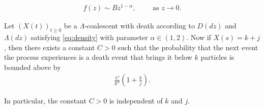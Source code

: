 \documentclass[10pt,a4paper]{amsart}
\begin{document}
\begin{align*}\label{eq:density}\tag{$\star$}
    f(z) \sim Bz^{1-\alpha}, \qquad \text{ as $z \to 0$}.
\end{align*}

\begin{lemma}\label{L:largedeath}
    Let $(X(t))_{t \geq 0}$ be a $\Lambda$-coalescent with death according to $D(dz)$ and $\Lambda(dz)$ satisfying \eqref{eq:density} with parameter $\alpha \in (1,2)$. Now if $X(s) = k+j$, then there exists a constant $C > 0$ such that the probability that the next event the process experiences is a death event that brings it below $k$ particles is bounded above by
    \begin{align*}
        \frac{C}{k^\alpha}\left(1 + \frac{k}{j} \right).
    \end{align*}

    \noindent In particular, the constant $C > 0$ is independent of $k$ and $j$.
\end{lemma}
\end{document}
